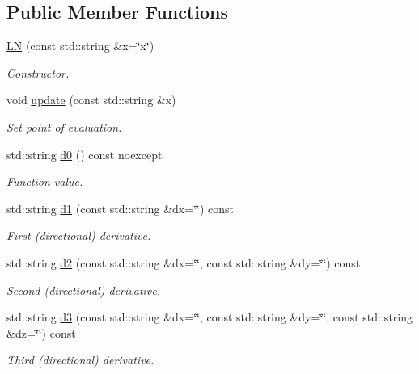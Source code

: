 \subsection*{Public Member Functions}
\begin{DoxyCompactItemize}
\item 
\hyperlink{structFunG_1_1texify_1_1LN_ac03ec5ea34f9512638351cc57481bb41}{L\-N} (const std\-::string \&x=\char`\"{}x\char`\"{})
\begin{DoxyCompactList}\small\item\em Constructor. \end{DoxyCompactList}\item 
void \hyperlink{structFunG_1_1texify_1_1LN_a4e6d31d55ae11d0373c2e4c928988b7e}{update} (const std\-::string \&x)
\begin{DoxyCompactList}\small\item\em Set point of evaluation. \end{DoxyCompactList}\item 
std\-::string \hyperlink{structFunG_1_1texify_1_1LN_a383f0c9c02830607f55b3286b2a9088e}{d0} () const noexcept
\begin{DoxyCompactList}\small\item\em Function value. \end{DoxyCompactList}\item 
std\-::string \hyperlink{structFunG_1_1texify_1_1LN_a3b19e2918fec4eaa9cff95010c633235}{d1} (const std\-::string \&dx=\char`\"{}\char`\"{}) const 
\begin{DoxyCompactList}\small\item\em First (directional) derivative. \end{DoxyCompactList}\item 
std\-::string \hyperlink{structFunG_1_1texify_1_1LN_a68f8c6337531c83d107b2bf4b3acb89e}{d2} (const std\-::string \&dx=\char`\"{}\char`\"{}, const std\-::string \&dy=\char`\"{}\char`\"{}) const 
\begin{DoxyCompactList}\small\item\em Second (directional) derivative. \end{DoxyCompactList}\item 
std\-::string \hyperlink{structFunG_1_1texify_1_1LN_a571f67f455cba96ab397162c1e8ad4b1}{d3} (const std\-::string \&dx=\char`\"{}\char`\"{}, const std\-::string \&dy=\char`\"{}\char`\"{}, const std\-::string \&dz=\char`\"{}\char`\"{}) const 
\begin{DoxyCompactList}\small\item\em Third (directional) derivative. \end{DoxyCompactList}\end{DoxyCompactItemize}


